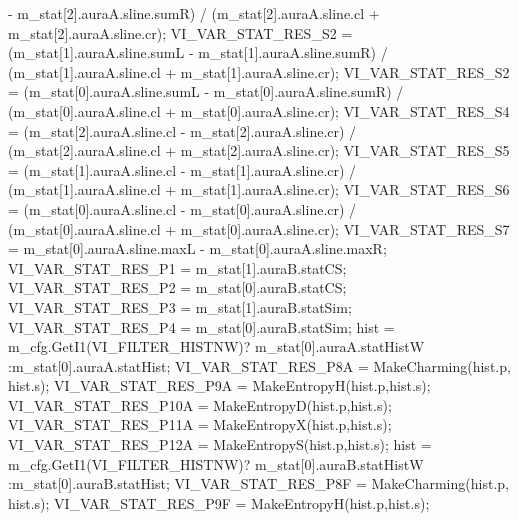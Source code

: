 -\/ m\+\_\+stat\mbox{[}2\mbox{]}.aura\+A.\+sline.\+sum\+R) / (m\+\_\+stat\mbox{[}2\mbox{]}.aura\+A.\+sline.\+cl + m\+\_\+stat\mbox{[}2\mbox{]}.aura\+A.\+sline.\+cr); V\+I\+\_\+\+V\+A\+R\+\_\+\+S\+T\+A\+T\+\_\+\+R\+E\+S\+\_\+\+S2 = (m\+\_\+stat\mbox{[}1\mbox{]}.aura\+A.\+sline.\+sum\+L -\/ m\+\_\+stat\mbox{[}1\mbox{]}.aura\+A.\+sline.\+sum\+R) / (m\+\_\+stat\mbox{[}1\mbox{]}.aura\+A.\+sline.\+cl + m\+\_\+stat\mbox{[}1\mbox{]}.aura\+A.\+sline.\+cr); V\+I\+\_\+\+V\+A\+R\+\_\+\+S\+T\+A\+T\+\_\+\+R\+E\+S\+\_\+\+S2 = (m\+\_\+stat\mbox{[}0\mbox{]}.aura\+A.\+sline.\+sum\+L -\/ m\+\_\+stat\mbox{[}0\mbox{]}.aura\+A.\+sline.\+sum\+R) / (m\+\_\+stat\mbox{[}0\mbox{]}.aura\+A.\+sline.\+cl + m\+\_\+stat\mbox{[}0\mbox{]}.aura\+A.\+sline.\+cr); V\+I\+\_\+\+V\+A\+R\+\_\+\+S\+T\+A\+T\+\_\+\+R\+E\+S\+\_\+\+S4 = (m\+\_\+stat\mbox{[}2\mbox{]}.aura\+A.\+sline.\+cl -\/ m\+\_\+stat\mbox{[}2\mbox{]}.aura\+A.\+sline.\+cr) / (m\+\_\+stat\mbox{[}2\mbox{]}.aura\+A.\+sline.\+cl + m\+\_\+stat\mbox{[}2\mbox{]}.aura\+A.\+sline.\+cr); V\+I\+\_\+\+V\+A\+R\+\_\+\+S\+T\+A\+T\+\_\+\+R\+E\+S\+\_\+\+S5 = (m\+\_\+stat\mbox{[}1\mbox{]}.aura\+A.\+sline.\+cl -\/ m\+\_\+stat\mbox{[}1\mbox{]}.aura\+A.\+sline.\+cr) / (m\+\_\+stat\mbox{[}1\mbox{]}.aura\+A.\+sline.\+cl + m\+\_\+stat\mbox{[}1\mbox{]}.aura\+A.\+sline.\+cr); V\+I\+\_\+\+V\+A\+R\+\_\+\+S\+T\+A\+T\+\_\+\+R\+E\+S\+\_\+\+S6 = (m\+\_\+stat\mbox{[}0\mbox{]}.aura\+A.\+sline.\+cl -\/ m\+\_\+stat\mbox{[}0\mbox{]}.aura\+A.\+sline.\+cr) / (m\+\_\+stat\mbox{[}0\mbox{]}.aura\+A.\+sline.\+cl + m\+\_\+stat\mbox{[}0\mbox{]}.aura\+A.\+sline.\+cr); V\+I\+\_\+\+V\+A\+R\+\_\+\+S\+T\+A\+T\+\_\+\+R\+E\+S\+\_\+\+S7 = m\+\_\+stat\mbox{[}0\mbox{]}.aura\+A.\+sline.\+max\+L -\/ m\+\_\+stat\mbox{[}0\mbox{]}.aura\+A.\+sline.\+max\+R; V\+I\+\_\+\+V\+A\+R\+\_\+\+S\+T\+A\+T\+\_\+\+R\+E\+S\+\_\+\+P1 = m\+\_\+stat\mbox{[}1\mbox{]}.aura\+B.\+stat\+C\+S; V\+I\+\_\+\+V\+A\+R\+\_\+\+S\+T\+A\+T\+\_\+\+R\+E\+S\+\_\+\+P2 = m\+\_\+stat\mbox{[}0\mbox{]}.aura\+B.\+stat\+C\+S; V\+I\+\_\+\+V\+A\+R\+\_\+\+S\+T\+A\+T\+\_\+\+R\+E\+S\+\_\+\+P3 = m\+\_\+stat\mbox{[}1\mbox{]}.aura\+B.\+stat\+Sim; V\+I\+\_\+\+V\+A\+R\+\_\+\+S\+T\+A\+T\+\_\+\+R\+E\+S\+\_\+\+P4 = m\+\_\+stat\mbox{[}0\mbox{]}.aura\+B.\+stat\+Sim; hist = m\+\_\+cfg.\+Get\+I1(\+V\+I\+\_\+\+F\+I\+L\+T\+E\+R\+\_\+\+H\+I\+S\+T\+N\+W)? m\+\_\+stat\mbox{[}0\mbox{]}.aura\+A.\+stat\+Hist\+W \+:m\+\_\+stat\mbox{[}0\mbox{]}.aura\+A.\+stat\+Hist; V\+I\+\_\+\+V\+A\+R\+\_\+\+S\+T\+A\+T\+\_\+\+R\+E\+S\+\_\+\+P8\+A = Make\+Charming(hist.\+p, hist.\+s); V\+I\+\_\+\+V\+A\+R\+\_\+\+S\+T\+A\+T\+\_\+\+R\+E\+S\+\_\+\+P9\+A = Make\+Entropy\+H(hist.\+p,hist.\+s); V\+I\+\_\+\+V\+A\+R\+\_\+\+S\+T\+A\+T\+\_\+\+R\+E\+S\+\_\+\+P10\+A = Make\+Entropy\+D(hist.\+p,hist.\+s); V\+I\+\_\+\+V\+A\+R\+\_\+\+S\+T\+A\+T\+\_\+\+R\+E\+S\+\_\+\+P11\+A = Make\+Entropy\+X(hist.\+p,hist.\+s); V\+I\+\_\+\+V\+A\+R\+\_\+\+S\+T\+A\+T\+\_\+\+R\+E\+S\+\_\+\+P12\+A = Make\+Entropy\+S(hist.\+p,hist.\+s); hist = m\+\_\+cfg.\+Get\+I1(\+V\+I\+\_\+\+F\+I\+L\+T\+E\+R\+\_\+\+H\+I\+S\+T\+N\+W)? m\+\_\+stat\mbox{[}0\mbox{]}.aura\+B.\+stat\+Hist\+W \+:m\+\_\+stat\mbox{[}0\mbox{]}.aura\+B.\+stat\+Hist; V\+I\+\_\+\+V\+A\+R\+\_\+\+S\+T\+A\+T\+\_\+\+R\+E\+S\+\_\+\+P8\+F = Make\+Charming(hist.\+p, hist.\+s); V\+I\+\_\+\+V\+A\+R\+\_\+\+S\+T\+A\+T\+\_\+\+R\+E\+S\+\_\+\+P9\+F = Make\+Entropy\+H(hist.\+p,hist.\+s); 
